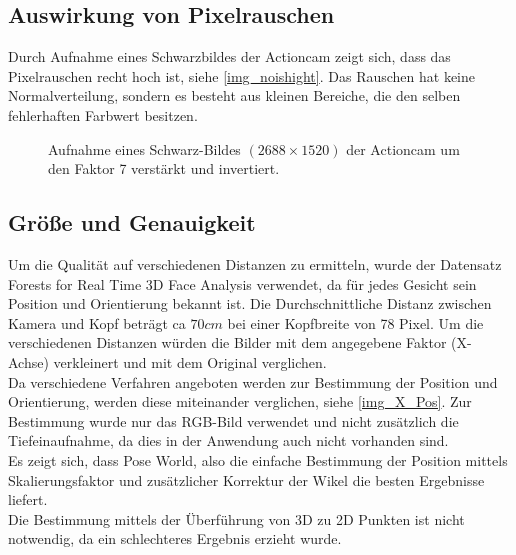 \subsection{Auswirkung von Pixelrauschen}
Durch Aufnahme eines Schwarzbildes der Actioncam zeigt sich, dass das Pixelrauschen recht hoch ist, siehe \autoref{img_noishight}. Das Rauschen hat keine Normalverteilung, sondern es besteht aus kleinen Bereiche, die den selben fehlerhaften Farbwert besitzen.
\begin{figure}
	\centering
	\caption{Aufnahme eines Schwarz-Bildes $(2688\times 1520)$ der Actioncam um den Faktor 7 verstärkt und invertiert.}
	\label{img_noishight}
\end{figure}
\subsection{Größe und Genauigkeit}
Um die Qualität auf verschiedenen Distanzen zu ermitteln, wurde der Datensatz Forests for Real Time 3D Face Analysis \cite{database_Face_Ori} verwendet, da für jedes Gesicht sein Position und Orientierung bekannt ist.
Die Durchschnittliche Distanz zwischen Kamera und Kopf beträgt ca $70cm$ bei einer Kopfbreite von 78 Pixel. Um die verschiedenen Distanzen würden die Bilder mit dem angegebene Faktor (X-Achse) verkleinert und mit dem Original verglichen.\\
Da verschiedene Verfahren angeboten werden zur Bestimmung der Position und Orientierung, werden diese miteinander verglichen, siehe \autoref{img_X_Pos}. Zur Bestimmung wurde nur das RGB-Bild verwendet und nicht zusätzlich die Tiefeinaufnahme, da dies in der Anwendung auch nicht vorhanden sind.\\
Es zeigt sich, dass Pose World, also die einfache Bestimmung der Position mittels Skalierungsfaktor und zusätzlicher Korrektur der Wikel die besten Ergebnisse liefert.\\
Die Bestimmung mittels der Überführung von 3D zu 2D Punkten ist nicht notwendig, da ein schlechteres Ergebnis erzieht wurde.
